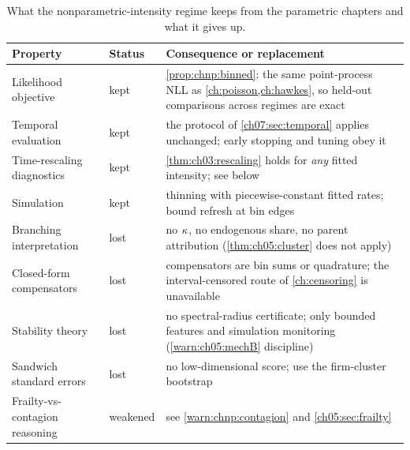 \begin{table}[htbp]
\centering
\small
\begin{tabular}{p{} p{} p{}}
\toprule
\textbf{Property} & \textbf{Status} & \textbf{Consequence or replacement} \\
\midrule
Likelihood objective & kept & \cref{prop:chnp:binned}: the same
point-process NLL as \cref{ch:poisson,ch:hawkes}, so held-out
comparisons across regimes are exact \\
\addlinespace
Temporal evaluation & kept & the protocol of \cref{ch07:sec:temporal}
applies unchanged; early stopping and tuning obey it \\
\addlinespace
Time-rescaling diagnostics & kept & \cref{thm:ch03:rescaling} holds for
\emph{any} fitted intensity; see below \\
\addlinespace
Simulation & kept & thinning \citep{lewisshedler1979} with
piecewise-constant fitted rates; bound refresh at bin edges \\
\addlinespace
Branching interpretation & lost & no $\kappa$, no endogenous share, no
parent attribution (\cref{thm:ch05:cluster} does not apply) \\
\addlinespace
Closed-form compensators & lost & compensators are bin sums or
quadrature; the interval-censored route of \cref{ch:censoring} is
unavailable \\
\addlinespace
Stability theory & lost & no spectral-radius certificate; only bounded
features and simulation monitoring (\cref{warn:ch05:mechB} discipline) \\
\addlinespace
Sandwich standard errors & lost & no low-dimensional score; use the
firm-cluster bootstrap \citep{efron1994} \\
\addlinespace
Frailty-vs-contagion reasoning & weakened & see
\cref{warn:chnp:contagion} and \cref{ch05:sec:frailty} \\
\bottomrule
\end{tabular}
\caption{What the nonparametric-intensity regime keeps from the
parametric chapters and what it gives up.}
\label{tab:chnp:ledger}
\end{table}

